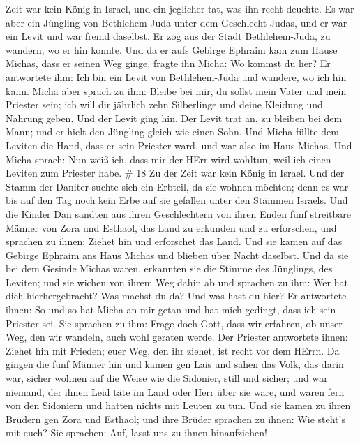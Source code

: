 Zeit war kein König in Israel, und ein jeglicher tat, was ihn recht
deuchte.  Es war aber ein Jüngling von Bethlehem-Juda unter
dem Geschlecht Judas, und er war ein Levit und war fremd daselbst.
 Er zog aus der Stadt Bethlehem-Juda, zu wandern, wo er hin
konnte. Und da er aufs Gebirge Ephraim kam zum Hause Michas, dass er
seinen Weg ginge,  fragte ihn Micha: Wo kommst du her? Er
antwortete ihm: Ich bin ein Levit von Bethlehem-Juda und wandere, wo ich
hin kann.  Micha aber sprach zu ihm: Bleibe bei mir, du
sollst mein Vater und mein Priester sein; ich will dir jährlich zehn
Silberlinge und deine Kleidung und Nahrung geben. Und der Levit ging
hin.  Der Levit trat an, zu bleiben bei dem Mann; und er
hielt den Jüngling gleich wie einen Sohn.  Und Micha füllte
dem Leviten die Hand, dass er sein Priester ward, und war also im Haus
Michas.  Und Micha sprach: Nun weiß ich, dass mir der HErr
wird wohltun, weil ich einen Leviten zum Priester habe. \# 18
 Zu der Zeit war kein König in Israel. Und der Stamm der
Daniter suchte sich ein Erbteil, da sie wohnen möchten; denn es war bis
auf den Tag noch kein Erbe auf sie gefallen unter den Stämmen Israels.
 Und die Kinder Dan sandten aus ihren Geschlechtern von
ihren Enden fünf streitbare Männer von Zora und Esthaol, das Land zu
erkunden und zu erforschen, und sprachen zu ihnen: Ziehet hin und
erforschet das Land. Und sie kamen auf das Gebirge Ephraim ans Haus
Michas und blieben über Nacht daselbst.  Und da sie bei dem
Gesinde Michas waren, erkannten sie die Stimme des Jünglings, des
Leviten; und sie wichen von ihrem Weg dahin ab und sprachen zu ihm: Wer
hat dich hierhergebracht? Was machst du da? Und was hast du hier?
 Er antwortete ihnen: So und so hat Micha an mir getan und
hat mich gedingt, dass ich sein Priester sei.  Sie sprachen
zu ihm: Frage doch Gott, dass wir erfahren, ob unser Weg, den wir
wandeln, auch wohl geraten werde.  Der Priester antwortete
ihnen: Ziehet hin mit Frieden; euer Weg, den ihr ziehet, ist recht vor
dem HErrn.  Da gingen die fünf Männer hin und kamen gen Lais
und sahen das Volk, das darin war, sicher wohnen auf die Weise wie die
Sidonier, still und sicher; und war niemand, der ihnen Leid täte im Land
oder Herr über sie wäre, und waren fern von den Sidoniern und hatten
nichts mit Leuten zu tun.  Und sie kamen zu ihren Brüdern
gen Zora und Esthaol; und ihre Brüder sprachen zu ihnen: Wie steht's mit
euch?  Sie sprachen: Auf, lasst uns zu ihnen hinaufziehen!
